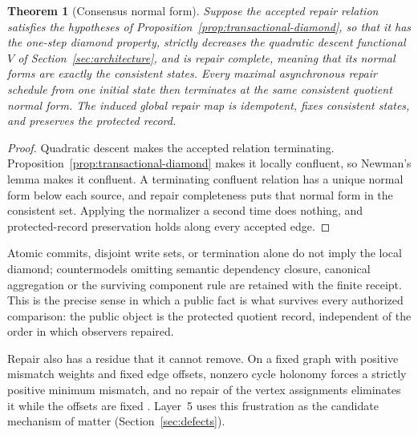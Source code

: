 \documentclass[11pt]{article}
\newtheorem{theorem}{Theorem}[section]
\theoremstyle{definition}
\theoremstyle{remark}
\begin{document}
\begin{theorem}[Consensus normal form]
\label{thm:confluence}
Suppose the accepted repair relation satisfies the hypotheses of Proposition~\ref{prop:transactional-diamond}, so that it has the one-step diamond property, strictly decreases the quadratic descent functional $V$ of Section~\ref{sec:architecture}, and is repair complete, meaning that its normal forms are exactly the consistent states. Every maximal asynchronous
repair schedule from one initial state then terminates at the same consistent
quotient normal form. The induced global repair map is idempotent, fixes
consistent states, and preserves the protected record.
\end{theorem}

\begin{proof}
Quadratic descent makes the accepted relation terminating.
Proposition~\ref{prop:transactional-diamond} makes it locally confluent, so
Newman's lemma \cite{newman42} makes it confluent. A terminating confluent
relation has a unique normal form below each source, and repair completeness
puts that normal form in the consistent set. Applying the normalizer a second
time does nothing, and protected-record preservation holds along every
accepted edge.
\end{proof}

Atomic commits, disjoint write sets, or termination alone do not imply the
local diamond; countermodels omitting semantic dependency closure, canonical
aggregation or the surviving component rule are retained with the finite
receipt. This is the precise sense in which a public fact is what survives
every authorized comparison: the public object is the protected quotient
record, independent of the order in which observers repaired.

Repair also has a residue that it cannot remove. On a fixed graph with
positive mismatch weights and fixed edge offsets, nonzero cycle holonomy
forces a strictly positive minimum mismatch, and no repair of the vertex
assignments eliminates it while the offsets are fixed \cite{ophconsensus}.
Layer~5 uses this frustration as the candidate mechanism of matter
(Section~\ref{sec:defects}).
\end{document}
